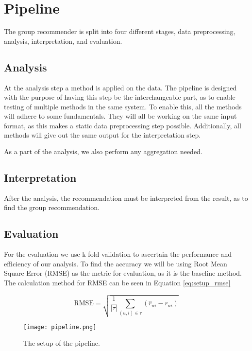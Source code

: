 \section{Pipeline}	\label{st:pipeline}
The group recommender is split into four different stages, data preprocessing, analysis, interpretation, and evaluation.



\subsection{Analysis}
At the analysis step a method is applied on the data. The pipeline is designed with the purpose of having this step be the interchangeable part, as to enable testing of multiple methods in the same system. To enable this, all the methods will adhere to some fundamentals. They will all be working on the same input format, as this makes a static data preprocessing step possible. Additionally, all methods will give out the same output for the interpretation step.

As a part of the analysis, we also perform any aggregation needed.
\subsection{Interpretation}
After the analysis, the recommendation must be interpreted from the result, as to find the group recommendation.
\subsection{Evaluation}
For the evaluation we use k-fold validation to ascertain the performance and efficiency of our analysis.
To find the accuracy we will be using Root Mean Square Error (RMSE) as the metric for evaluation, as it is the baseline method. The calculation method for RMSE can be seen in Equation \ref{eq:setup_rmse}

\begin{equation} \label{eq:setup_rmse}
	\text{RMSE} = \sqrt{\frac{1}{|\tau|}\sum_{(u,i)\in \tau}(\hat{r}_{ui}-r_{ui})}
\end{equation}


\begin{figure}
	\centering
	\texttt{[image: pipeline.png]}
	\caption{The setup of the pipeline. \label{fig:setup_pipeline}}
\end{figure}